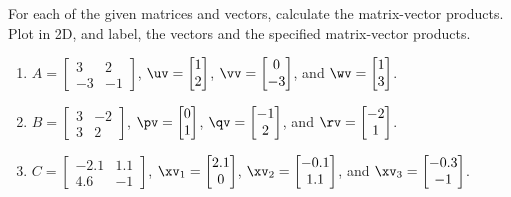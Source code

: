 \begin{exercise} \label{ex:matvec} 
For each of the given matrices and vectors, calculate the matrix-vector products.  Plot in 2D, and label, the vectors and the specified matrix-vector products.
\begin{enumerate}
\item\label{ex:matveci} \(A=\begin{bmatrix} 3&2
\\-3&-1 \end{bmatrix}\), 
\(\uv=\begin{bmatrix} 1\\2 \end{bmatrix}\),
\(\vv=\begin{bmatrix} 0\\-3 \end{bmatrix}\), and
\(\wv=\begin{bmatrix} 1\\3 \end{bmatrix}\).


\item\label{ex:matvecii} \(B=\begin{bmatrix} 3&-2
\\3&2 \end{bmatrix}\), 
\(\pv=\begin{bmatrix} 0\\1 \end{bmatrix}\),
\(\qv=\begin{bmatrix} -1\\2 \end{bmatrix}\), and
\(\rv=\begin{bmatrix} -2\\1 \end{bmatrix}\).


\item\label{ex:matveciii} \(C=\begin{bmatrix} -2.1&1.1
\\4.6&-1 \end{bmatrix}\), 
\(\xv_1=\begin{bmatrix} 2.1\\0 \end{bmatrix}\),
\(\xv_2=\begin{bmatrix} -0.1\\1.1 \end{bmatrix}\), and
\(\xv_3=\begin{bmatrix} -0.3\\-1 \end{bmatrix}\).



\end{enumerate}
\end{exercise}
